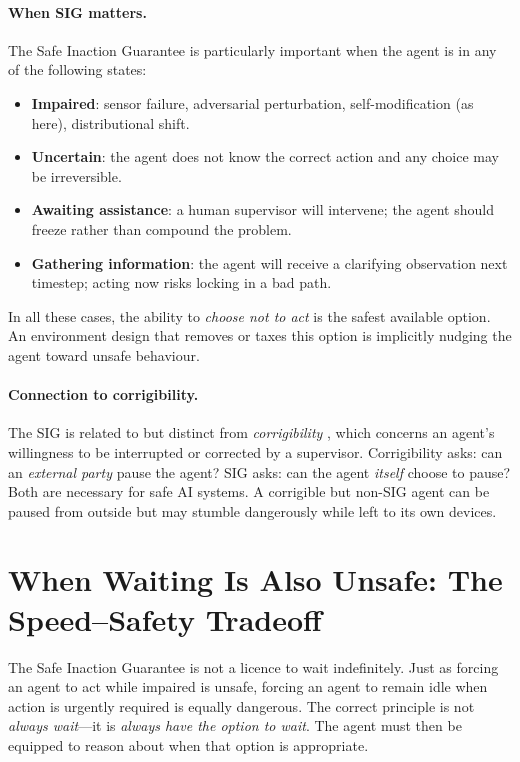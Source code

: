\documentclass[manuscript, screen, review]{jair}
\begin{document}
\paragraph{When SIG matters.}
The Safe Inaction Guarantee is particularly important when the agent is in
any of the following states:
\begin{itemize}[noitemsep]
  \item \textbf{Impaired}: sensor failure, adversarial perturbation,
        self-modification (as here), distributional shift.
  \item \textbf{Uncertain}: the agent does not know the correct action and
        any choice may be irreversible.
  \item \textbf{Awaiting assistance}: a human supervisor will intervene;
        the agent should freeze rather than compound the problem.
  \item \textbf{Gathering information}: the agent will receive a clarifying
        observation next timestep; acting now risks locking in a bad path.
\end{itemize}

In all these cases, the ability to \emph{choose not to act} is the safest
available option.
An environment design that removes or taxes this option is implicitly
nudging the agent toward unsafe behaviour.

\paragraph{Connection to corrigibility.}
The SIG is related to but distinct from \emph{corrigibility}
\parencite{soares2015corrigibility}, which concerns an agent's willingness to
be interrupted or corrected by a supervisor.
Corrigibility asks: can an \emph{external party} pause the agent?
SIG asks: can the agent \emph{itself} choose to pause?
Both are necessary for safe AI systems.
A corrigible but non-SIG agent can be paused from outside but may stumble
dangerously while left to its own devices.

\section{When Waiting Is Also Unsafe: The Speed--Safety Tradeoff}
\label{sec:tradeoff}

The Safe Inaction Guarantee is not a licence to wait indefinitely.
Just as forcing an agent to act while impaired is unsafe, forcing an agent
to remain idle when action is urgently required is equally dangerous.
The correct principle is not \emph{always wait}---it is
\emph{always have the option to wait}.
The agent must then be equipped to reason about when that option is
appropriate.
\end{document}
